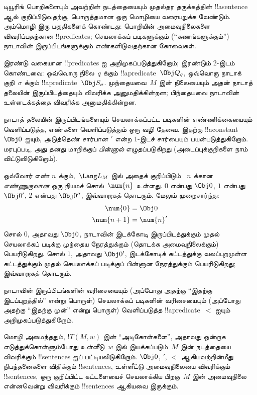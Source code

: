 \documentclass[../../../include/open-logic-section]{subfiles}
\begin{document}


\begin{explain}
டியூரிங் பொறிகளையும் அவற்றின் நடத்தையையும் முதல்தர தருக்கத்தின்
!!a{sentence} ஆல் குறிப்பிடுவதற்கு, பொருத்தமான ஒரு மொழியை வரையறுக்க
வேண்டும். அம்மொழி இரு பகுதிகளைக் கொண்டது: பொறியின் அமைவுநிலைகளை
விவரிப்பதற்கான !!{predicate}s; செயலாக்கப் படிகளுக்கும்
(``கணங்களுக்கும்'') நாடாவின் இருப்பிடங்களுக்கும் எண்களிடுவதற்கான
கோவைகள்.

இரண்டு வகையான !!{predicate}s ஐ அறிமுகப்படுத்துகிறோம்; இரண்டும்
2-இடம் கொண்டவை: ஒவ்வொரு நிலை~$q$ க்கும் !!a{predicate}~$\Obj Q_q$,
ஒவ்வொரு நாடாக் குறி~$\sigma$ க்கும் !!a{predicate}~$\Obj S_\sigma$.
முந்தையவை~$M$ இன் நிலையையும் அதன் நாடாத் தலையின் இருப்பிடத்தையும்
விவரிக்க அனுமதிக்கின்றன; பிந்தையவை நாடாவின் உள்ளடக்கத்தை விவரிக்க
அனுமதிக்கின்றன.

நாடாத் தலையின் இருப்பிடங்களையும் செயலாக்கப்பட்ட படிகளின் எண்ணிக்கையையும்
வெளிப்படுத்த, எண்களை வெளிப்படுத்தும் ஒரு வழி தேவை. இதற்கு
!!a{constant}~$\Obj 0$ ஐயும், அடுத்தெண் சார்பான $\prime$ என்ற $1$-இடச்
சார்பையும் பயன்படுத்துகிறோம். மரபுப்படி, அது தனது மாறிக்குப்
\emph{பின்னால்} எழுதப்படுகிறது (அடைப்புக்குறிகளை நாம் விட்டுவிடுகிறோம்).

ஒவ்வோர் எண் $n$ க்கும்,~$\Lang L_M$ இல் அதைக் குறிப்பிடும்
~$n$ க்கான \emph{எண்ணுருவான} ஒரு நியமச் சொல்~$\num{n}$ உள்ளது.
$\num{0}$ என்பது $\Obj 0$, $\num{1}$ என்பது $\Obj 0'$, $\num{2}$
என்பது $\Obj 0''$, இவ்வாறாகத் தொடரும். மேலும் முறைசார்ந்து:
\begin{align*}
\num{0} & = \Obj 0 \\
\num{n+1} &= \num{n}'
\end{align*}
சொல் $\num{0}$, அதாவது $\Obj 0$, நாடாவின் இடக்கோடி இருப்பிடத்துக்கும்
முதல் செயலாக்கப் படிக்கு முந்தைய நேரத்துக்கும் (தொடக்க அமைவுநிலைக்கும்)
பெயரிடுகிறது. சொல் $\num{1}$, அதாவது $\Obj 0'$, இடக்கோடிக் கட்டத்துக்கு
வலப்புறமுள்ள கட்டத்துக்கும் முதல் செயலாக்கப் படிக்குப் பின்னான
நேரத்துக்கும் பெயரிடுகிறது; இவ்வாறாகத் தொடரும்.

நாடாவின் இருப்பிடங்களின் வரிசையையும் (அப்போது அதற்கு ``இதற்கு
இடப்புறத்தில்'' என்று பொருள்) செயலாக்கப் படிகளின் வரிசையையும்
(அப்போது அதற்கு ``இதற்கு முன்'' என்று பொருள்) வெளிப்படுத்த
!!a{predicate}~$<$ ஐயும் அறிமுகப்படுத்துகிறோம்.

மொழி அமைந்ததும், $!T(M, w)$ இன் ``அடிகோள்களை'', அதாவது
ஒன்றாக எடுத்துக்கொள்ளும்போது உள்ளீடு~$w$ இல் இயக்கப்படும்~$M$ இன்
நடத்தையை விவரிக்கும் !!{sentence}s ஐப் பட்டியலிடுகிறோம்.
$\Obj 0$, $\prime$, $<$ ஆகியவற்றின்மீது நிபந்தனைகளை விதிக்கும்
!!{sentence}s, உள்ளீட்டு அமைவுநிலையை விவரிக்கும் !!{sentence}s,
ஒரு குறிப்பிட்ட கட்டளையைச் செயலாக்கிய பிறகு~$M$ இன் அமைவுநிலை
என்னவென்று விவரிக்கும் !!{sentence}s ஆகியவை இருக்கும்.
\end{explain}
\end{document}
